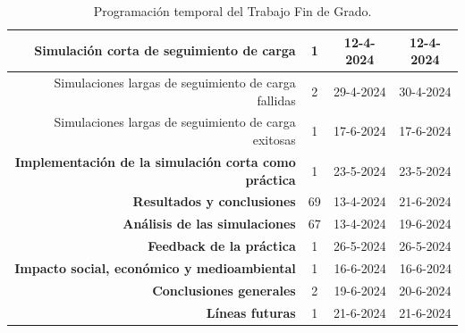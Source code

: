 \begin{table}[!h]
\begin{tabular}{|r|c|c|c|}
    \rowcolor[HTML]{ECF4FF} 
    Simulación corta de seguimiento de carga                     & 1                         & 12-4-2024                         & \cellcolor[HTML]{ECF4FF}12-4-2024 \\ \hline
    \rowcolor[HTML]{ECF4FF} 
    Simulaciones largas de seguimiento de carga fallidas         & 2                         & 29-4-2024                         & 30-4-2024                         \\ \hline
    \rowcolor[HTML]{ECF4FF} 
    Simulaciones largas de seguimiento de carga exitosas &
      1 &
      17-6-2024 &
      \cellcolor[HTML]{ECF4FF}17-6-2024 \\ \hline
    \rowcolor[HTML]{CBE5CB} 
    \textbf{Implementación de la simulación corta como práctica} & 1                         & 23-5-2024                         & 23-5-2024                         \\ \hline
    \rowcolor[HTML]{FFCE93} 
    \textbf{Resultados y conclusiones}                           & 69                        & 13-4-2024                         & 21-6-2024                         \\ \hline
    \rowcolor[HTML]{CBE5CB} 
    \textbf{Análisis de las simulaciones}                        & 67                        & 13-4-2024                         & 19-6-2024                         \\ \hline
    \rowcolor[HTML]{CBE5CB} 
    \textbf{Feedback de la práctica}                             & 1                         & 26-5-2024                         & 26-5-2024                         \\ \hline
    \rowcolor[HTML]{CBE5CB} 
    \textbf{Impacto social, económico y medioambiental} &
      \cellcolor[HTML]{CBE5CB}1 &
      \multicolumn{1}{r|}{\cellcolor[HTML]{CBE5CB}16-6-2024} &
      \multicolumn{1}{r|}{\cellcolor[HTML]{CBE5CB}16-6-2024} \\ \hline
    \rowcolor[HTML]{CBE5CB} 
    \textbf{Conclusiones generales} &
      \cellcolor[HTML]{CBE5CB}2 &
      \multicolumn{1}{r|}{\cellcolor[HTML]{CBE5CB}19-6-2024} &
      \cellcolor[HTML]{CBE5CB}20-6-2024 \\ \hline
    \rowcolor[HTML]{CBE5CB} 
    \textbf{Líneas futuras}                                      & \cellcolor[HTML]{CBE5CB}1 & \cellcolor[HTML]{CBE5CB}21-6-2024 & 21-6-2024                         \\ \hline
    \end{tabular}
    \caption{Programación temporal del Trabajo Fin de Grado.}
    \label{tab:progamacion_temporal_tfg}
    \end{table}

